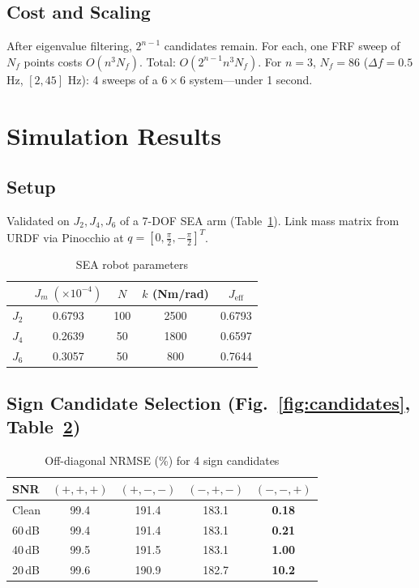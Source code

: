 \documentclass[10pt,twocolumn]{article}
\begin{document}
\subsection{Cost and Scaling}

After eigenvalue filtering, $2^{n-1}$ candidates remain. For each, one FRF sweep of $N_f$ points costs $O(n^3 N_f)$. Total: $O(2^{n-1} n^3 N_f)$. For $n=3$, $N_f=86$ ($\Delta f=0.5$ Hz, $[2,45]$ Hz): 4 sweeps of a $6\times 6$ system---under 1 second.

\section{Simulation Results}

\subsection{Setup}

Validated on $J_2, J_4, J_6$ of a 7-DOF SEA arm (Table~\ref{tab:params}). Link mass matrix from URDF via Pinocchio at $q=[0,\frac{\pi}{2},-\frac{\pi}{2}]^T$.

\begin{table}[ht]
\centering
\caption{SEA robot parameters}
\label{tab:params}
\begin{tabular}{ccccc}
\toprule
& $J_m\;(\times 10^{-4})$ & $N$ & $k$ (Nm/rad) & $J_\mathrm{eff}$ \\
\midrule
$J_2$ & 0.6793 & 100 & 2500 & 0.6793 \\
$J_4$ & 0.2639 & 50 & 1800 & 0.6597 \\
$J_6$ & 0.3057 & 50 & 800 & 0.7644 \\
\bottomrule
\end{tabular}
\end{table}

\subsection{Sign Candidate Selection (Fig.~\ref{fig:candidates}, Table~\ref{tab:nrmse})}

\begin{table}[ht]
\centering
\caption{Off-diagonal NRMSE (\%) for 4 sign candidates}
\label{tab:nrmse}
\begin{tabular}{lcccc}
\toprule
SNR & $(+,+,+)$ & $(+,-,-)$ & $(-,+,-)$ & $\mathbf{(-,-,+)}$ \\
\midrule
Clean   & 99.4 & 191.4 & 183.1 & \textbf{0.18} \\
60\,dB  & 99.4 & 191.4 & 183.1 & \textbf{0.21} \\
40\,dB  & 99.5 & 191.5 & 183.1 & \textbf{1.00} \\
20\,dB  & 99.6 & 190.9 & 182.7 & \textbf{10.2} \\
\bottomrule
\end{tabular}
\end{table}
\end{document}
